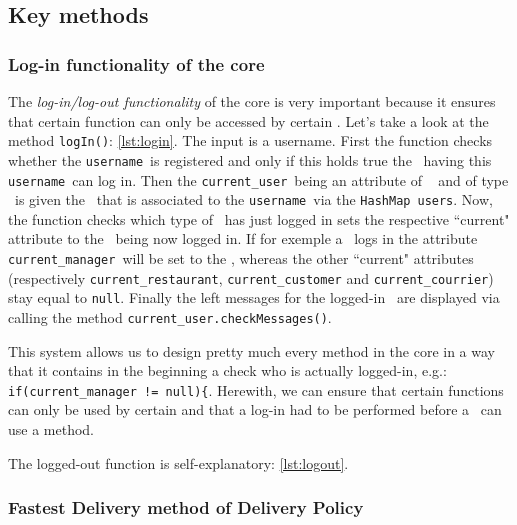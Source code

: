 \subsection{Key methods} %
\label{sub:key_methods}


\subsubsection{Log-in functionality of the core} %
\label{ssub:log_in_functionality_of_the_core}

The \emph{log-in/log-out functionality} of the core is very important because it ensures that certain function can only be accessed by certain \User. Let's take a look at the method \lstinline|logIn()|: \ref{lst:login}. The input is a username. First the function checks whether the \lstinline|username|~is registered and only if this holds true the \User~having this \lstinline|username|~can log in. Then the \lstinline|current_user|~being an attribute of \Core~ and of type \User~is given the \User~that is associated to the \lstinline|username|~via the \lstinline|HashMap|~\lstinline|users|. Now, the function checks which type of \User~has just logged in sets the respective ``current" attribute to the \User~being now logged in. If for exemple a \Manager~logs in the attribute \lstinline|current_manager|~will be set to the \User, whereas the other ``current" attributes (respectively \lstinline|current_restaurant|, \lstinline|current_customer| and \lstinline|current_courrier|) stay equal to \lstinline|null|. Finally the left messages for the logged-in \User~are displayed via calling the method \lstinline|current_user.checkMessages()|.

This system allows us to design pretty much every method in the core in a way that it contains in the beginning a check who is actually logged-in, e.g.: \lstinline|if(current_manager != null){|. Herewith, we can ensure that certain functions can only be used by certain \User and that a log-in had to be performed before a \User~can use a method.

The logged-out function is self-explanatory: \ref{lst:logout}.


\subsubsection{Fastest Delivery method of Delivery Policy} %
\label{ssub:fastest_delivery_method_of_delivery_policy}

